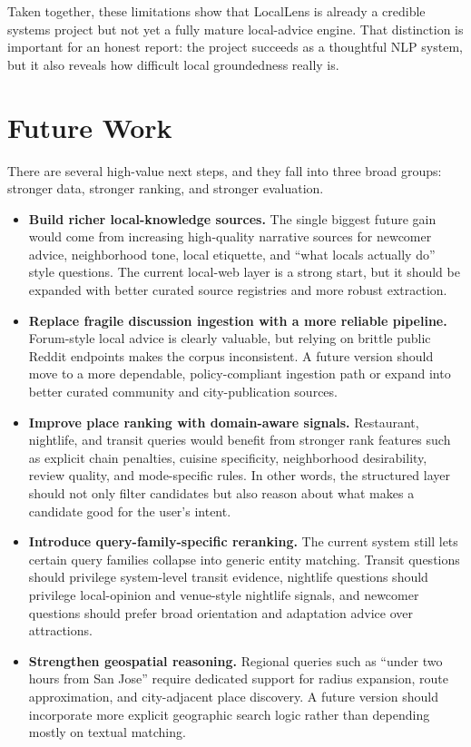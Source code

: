 \documentclass[11pt]{article}
\begin{document}
Taken together, these limitations show that LocalLens is already a credible systems project but not yet a fully mature local-advice engine. That distinction is important for an honest report: the project succeeds as a thoughtful NLP system, but it also reveals how difficult local groundedness really is.

\section{Future Work}
There are several high-value next steps, and they fall into three broad groups: stronger data, stronger ranking, and stronger evaluation.

\begin{itemize}[leftmargin=*]
    \item \textbf{Build richer local-knowledge sources.} The single biggest future gain would come from increasing high-quality narrative sources for newcomer advice, neighborhood tone, local etiquette, and ``what locals actually do'' style questions. The current local-web layer is a strong start, but it should be expanded with better curated source registries and more robust extraction.
    \item \textbf{Replace fragile discussion ingestion with a more reliable pipeline.} Forum-style local advice is clearly valuable, but relying on brittle public Reddit endpoints makes the corpus inconsistent. A future version should move to a more dependable, policy-compliant ingestion path or expand into better curated community and city-publication sources.
    \item \textbf{Improve place ranking with domain-aware signals.} Restaurant, nightlife, and transit queries would benefit from stronger rank features such as explicit chain penalties, cuisine specificity, neighborhood desirability, review quality, and mode-specific rules. In other words, the structured layer should not only filter candidates but also reason about what makes a candidate good for the user's intent.
    \item \textbf{Introduce query-family-specific reranking.} The current system still lets certain query families collapse into generic entity matching. Transit questions should privilege system-level transit evidence, nightlife questions should privilege local-opinion and venue-style nightlife signals, and newcomer questions should prefer broad orientation and adaptation advice over attractions.
    \item \textbf{Strengthen geospatial reasoning.} Regional queries such as ``under two hours from San Jose'' require dedicated support for radius expansion, route approximation, and city-adjacent place discovery. A future version should incorporate more explicit geographic search logic rather than depending mostly on textual matching.

\end{itemize}
\end{document}
